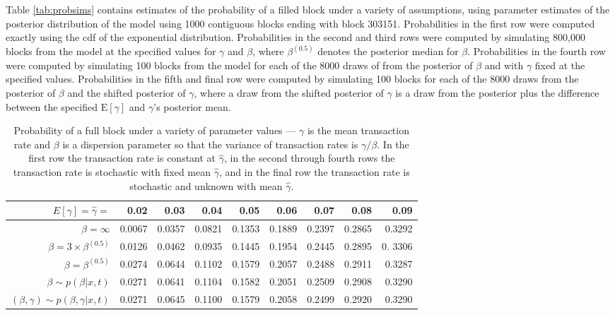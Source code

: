 \documentclass{article}
\begin{document}
 Table \ref{tab:probsims} contains estimates of the probability of a filled block under a variety of assumptions, using parameter estimates of the posterior distribution of the model using 1000 contiguous blocks ending with block 303151. Probabilities in the first row were computed exactly using the cdf of the exponential distribution. Probabilities in the second and third rows were computed by simulating 800,000 blocks from the model at the specified values for $\gamma$ and $\beta$, where $\beta^{(0.5)}$ denotes the posterior median for $\beta$. Probabilities in the fourth row were computed by simulating 100 blocks from the model for each of the 8000 draws of from the posterior of $\beta$ and with $\gamma$ fixed at the specified values. Probabilities in the fifth and final row were computed by simulating 100 blocks for each of the 8000 draws from the posterior of $\beta$ and the shifted posterior of $\gamma$, where a draw from the shifted posterior of $\gamma$ is a draw from the posterior plus the difference between the specified $\mathrm{E}[\gamma]$ and $\gamma$'s posterior mean. 

\begin{table}[ht]
\centering
\begin{tabular}{rrrrrrrrr}
  \hline
$E[\gamma] = \hat{\gamma} =$ & 0.02 & 0.03 & 0.04 & 0.05 & 0.06 & 0.07 & 0.08 & 0.09 \\ 
  \hline
$\beta = \infty$ & 0.0067 & 0.0357 & 0.0821 & 0.1353 & 0.1889 & 0.2397 & 0.2865 & 0.3292 \\ 
  $\beta = 3\times\beta^{(0.5)}$ & 0.0126 & 0.0462 & 0.0935 & 0.1445 & 0.1954 & 0.2445 & 0.2895 & 0.
3306 \\ 
  $\beta = \beta^{(0.5)}$ & 0.0274 & 0.0644 & 0.1102 & 0.1579 & 0.2057 & 0.2488 & 0.2911 & 0.3287 \\ 
  $\beta \sim p(\beta|x,t)$ & 0.0271 & 0.0641 & 0.1104 & 0.1582 & 0.2051 & 0.2509 & 0.2908 & 0.3290 \\ 
  $(\beta,\gamma) \sim p(\beta,\gamma|x,t)$ & 0.0271 & 0.0645 & 0.1100 & 0.1579 & 0.2058 & 0.2499 & 0.2920 & 0.3290 \\ 
   \hline
\end{tabular}
\caption{Probability of a full block under a variety of parameter values --- $\gamma$ is the mean transaction rate and $\beta$ is a dispersion parameter so that the variance of transaction rates is $\gamma/\beta$. In the first row the transaction rate is constant at $\hat{\gamma}$, in the second through fourth rows the transaction rate is stochastic with fixed mean $\hat{\gamma}$, and in the final row the transaction rate is stochastic and unknown with mean $\hat{\gamma}$.}
\end{table}
\end{document}

